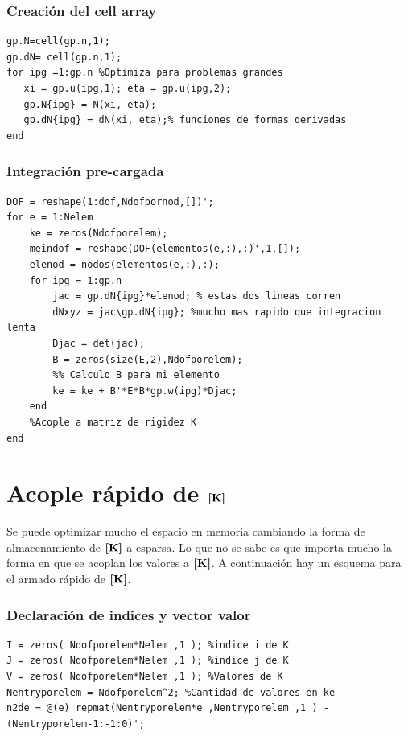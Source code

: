 \subsubsection*{Creación del cell array}
\begin{lstlisting}[caption = {Creación de struct relacionada a los puntos de Gauss.}]
gp.N=cell(gp.n,1);
gp.dN= cell(gp.n,1);
for ipg =1:gp.n %Optimiza para problemas grandes 
   xi = gp.u(ipg,1); eta = gp.u(ipg,2);
   gp.N{ipg} = N(xi, eta);
   gp.dN{ipg} = dN(xi, eta);% funciones de formas derivadas
end
\end{lstlisting}

\subsubsection*{Integración pre-cargada}

\begin{lstlisting}[caption = {Aplicación del método de integración pre-cargada.}]
DOF = reshape(1:dof,Ndofpornod,[])';
for e = 1:Nelem
    ke = zeros(Ndofporelem);
    meindof = reshape(DOF(elementos(e,:),:)',1,[]);
    elenod = nodos(elementos(e,:),:);
    for ipg = 1:gp.n
        jac = gp.dN{ipg}*elenod; % estas dos lineas corren
        dNxyz = jac\gp.dN{ipg}; %mucho mas rapido que integracion lenta
        Djac = det(jac);
        B = zeros(size(E,2),Ndofporelem);
        %% Calculo B para mi elemento
        ke = ke + B'*E*B*gp.w(ipg)*Djac;
    end
    %Acople a matriz de rigidez K
end
\end{lstlisting}

\section{Acople rápido de \(\boldsymbol{[}\mathbf{K} \boldsymbol{]} \)}

Se puede optimizar mucho el espacio en memoria cambiando la forma de almacenamiento de \(\boldsymbol{[}\mathbf{K} \boldsymbol{]} \) a esparsa. Lo que no se sabe es que importa mucho la forma en que se acoplan los valores a \(\boldsymbol{[}\mathbf{K} \boldsymbol{]} \). A continuación hay un esquema para el armado rápido de \(\boldsymbol{[}\mathbf{K} \boldsymbol{]} \).

\subsubsection*{Declaración de indices y vector valor}
\begin{lstlisting}
I = zeros( Ndofporelem*Nelem ,1 ); %indice i de K
J = zeros( Ndofporelem*Nelem ,1 ); %indice j de K
V = zeros( Ndofporelem*Nelem ,1 ); %Valores de K
Nentryporelem = Ndofporelem^2; %Cantidad de valores en ke
n2de = @(e) repmat(Nentryporelem*e ,Nentryporelem ,1 ) - (Nentryporelem-1:-1:0)';
\end{lstlisting}

